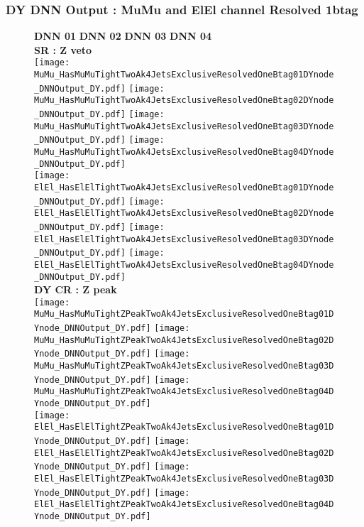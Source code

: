 \documentclass[9pt]{beamer}
\begin{document}
\begin{frame}
	\frametitle{DY DNN Output : MuMu and ElEl channel Resolved 1btag}
	\begin{figure}
	    \textbf{DNN 01} \hspace{1.2cm} \textbf{DNN 02} \hspace{1.2cm} \textbf{DNN 03} \hspace{1.2cm} \textbf{DNN 04} \\
        \centering
        \textbf{SR : Z veto} \\
		\texttt{[image: MuMu\_HasMuMuTightTwoAk4JetsExclusiveResolvedOneBtag01DYnode\_DNNOutput\_DY.pdf]}
		\texttt{[image: MuMu\_HasMuMuTightTwoAk4JetsExclusiveResolvedOneBtag02DYnode\_DNNOutput\_DY.pdf]}
		\texttt{[image: MuMu\_HasMuMuTightTwoAk4JetsExclusiveResolvedOneBtag03DYnode\_DNNOutput\_DY.pdf]}
		\texttt{[image: MuMu\_HasMuMuTightTwoAk4JetsExclusiveResolvedOneBtag04DYnode\_DNNOutput\_DY.pdf]}\\
		\texttt{[image: ElEl\_HasElElTightTwoAk4JetsExclusiveResolvedOneBtag01DYnode\_DNNOutput\_DY.pdf]}
		\texttt{[image: ElEl\_HasElElTightTwoAk4JetsExclusiveResolvedOneBtag02DYnode\_DNNOutput\_DY.pdf]}
		\texttt{[image: ElEl\_HasElElTightTwoAk4JetsExclusiveResolvedOneBtag03DYnode\_DNNOutput\_DY.pdf]}
		\texttt{[image: ElEl\_HasElElTightTwoAk4JetsExclusiveResolvedOneBtag04DYnode\_DNNOutput\_DY.pdf]}\\
        \textbf{DY CR : Z peak} \\
		\texttt{[image: MuMu\_HasMuMuTightZPeakTwoAk4JetsExclusiveResolvedOneBtag01DYnode\_DNNOutput\_DY.pdf]}
		\texttt{[image: MuMu\_HasMuMuTightZPeakTwoAk4JetsExclusiveResolvedOneBtag02DYnode\_DNNOutput\_DY.pdf]}
		\texttt{[image: MuMu\_HasMuMuTightZPeakTwoAk4JetsExclusiveResolvedOneBtag03DYnode\_DNNOutput\_DY.pdf]}
		\texttt{[image: MuMu\_HasMuMuTightZPeakTwoAk4JetsExclusiveResolvedOneBtag04DYnode\_DNNOutput\_DY.pdf]}\\
		\texttt{[image: ElEl\_HasElElTightZPeakTwoAk4JetsExclusiveResolvedOneBtag01DYnode\_DNNOutput\_DY.pdf]}
		\texttt{[image: ElEl\_HasElElTightZPeakTwoAk4JetsExclusiveResolvedOneBtag02DYnode\_DNNOutput\_DY.pdf]}
		\texttt{[image: ElEl\_HasElElTightZPeakTwoAk4JetsExclusiveResolvedOneBtag03DYnode\_DNNOutput\_DY.pdf]}
		\texttt{[image: ElEl\_HasElElTightZPeakTwoAk4JetsExclusiveResolvedOneBtag04DYnode\_DNNOutput\_DY.pdf]}\\
	\end{figure}
\end{frame}
\end{document}
